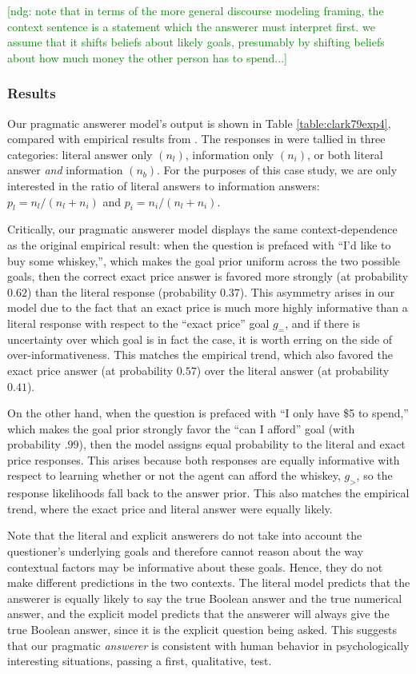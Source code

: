 \documentclass[12pt, floatsintext, jou]{apa6}
\newcommand{\ndg}[1]{\textcolor{Green}{[ndg: #1]}}
\begin{document}
\ndg{note that in terms of the more general discourse modeling framing, the context sentence is a statement which the answerer must interpret first. we assume that it shifts beliefs about likely goals, presumably by shifting beliefs about how much money the other person has to spend...}

\subsubsection{Results} 

Our pragmatic answerer model's output is shown in Table \ref{table:clark79exp4}, compared with empirical results from . The responses in  were tallied in three categories: literal answer only $(n_l)$, information only $(n_i)$, or both literal answer \emph{and} information $(n_b)$. For the purposes of this case study, we are only interested in the ratio of literal answers to information answers: $p_l = n_l/(n_l+n_i)$ and $p_i = n_i/(n_l+n_i)$.

Critically, our pragmatic answerer model displays the same context-dependence as the original empirical result: when the question is prefaced with ``I'd like to buy some whiskey,'', which makes the goal prior uniform across the two possible goals, then the correct exact price answer is favored more strongly (at probability $0.62$) than the literal response (probability $0.37$). This asymmetry arises in our model due to the fact that an exact price is much more highly informative than a literal response with respect to the ``exact price'' goal $g_=$, and if there is uncertainty over which goal is in fact the case, it is worth erring on the side of over-informativeness. This matches the empirical trend, which also favored the exact price answer (at probability $0.57$) over the literal answer (at probability $0.41$).

On the other hand, when the question is prefaced with ``I only have \$5 to spend,'' which makes the goal prior strongly favor the ``can I afford'' goal (with probability $.99$), then the model assigns equal probability to the literal and exact price responses. This arises because both responses are equally informative with respect to learning whether or not the agent can afford the whiskey, $g_>$, so the response likelihoods fall back to the answer prior. This also matches the empirical trend, where the exact price and literal answer were equally likely.

Note that the literal and explicit answerers do not take into account the questioner's underlying goals and therefore cannot reason about the way contextual factors may be informative about these goals. Hence, they do not make different predictions in the two contexts. The literal model predicts that the answerer is equally likely to say the true Boolean answer and the true numerical answer, and the explicit model predicts that the answerer will always give the true Boolean answer, since it is the explicit question being asked. This suggests that our pragmatic \emph{answerer} is consistent with human behavior in psychologically interesting situations, passing a first, qualitative, test. 
\end{document}
